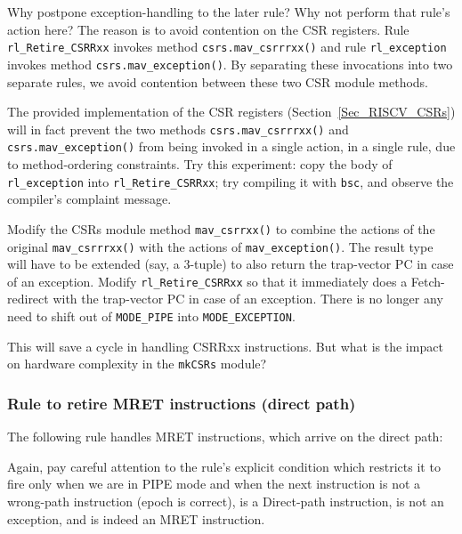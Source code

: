 Why postpone exception-handling to the later rule?  Why not perform
that rule's action here?  The reason is to avoid contention on the CSR
registers.  Rule \verb|rl_Retire_CSRRxx| invokes method
\verb|csrs.mav_csrrrxx()| and rule \verb|rl_exception| invokes method
\verb|csrs.mav_exception()|.  By separating these invocations into two
separate rules, we avoid contention between these two CSR module
methods.


\Exercise

The provided implementation of the CSR registers
(Section~\ref{Sec_RISCV_CSRs}) will in fact prevent the two methods
\verb|csrs.mav_csrrrxx()| and \verb|csrs.mav_exception()| from being
invoked in a single action, {\ie} in a single rule, due to
method-ordering constraints.  Try this experiment: copy the body of
\verb|rl_exception| into \verb|rl_Retire_CSRRxx|; try compiling it
with \verb|bsc|, and observe the compiler's complaint message.

\Exercise

Modify the CSRs module method \verb|mav_csrrxx()| to combine the
actions of the original \verb|mav_csrrrxx()| with the actions of
\verb|mav_exception()|.  The result type will have to be extended
(say, a 3-tuple) to also return the trap-vector PC in case of an
exception.  Modify \verb|rl_Retire_CSRRxx| so that it immediately does
a Fetch-redirect with the trap-vector PC in case of an exception.
There is no longer any need to shift out of \verb|MODE_PIPE| into
\verb|MODE_EXCEPTION|.

\vspace{1ex}

This will save a cycle in handling CSRRxx instructions.  But what is
the impact on hardware complexity in the \verb|mkCSRs| module?

\Endexercise


\subsubsection{Rule to retire MRET instructions (direct path)}

The following rule handles MRET instructions, which arrive on the direct path:


Again, pay careful attention to the rule's explicit condition which
restricts it to fire only when we are in PIPE mode and when the next
instruction is not a wrong-path instruction (epoch is correct), is a
Direct-path instruction, is not an exception, and is indeed an MRET
instruction.

